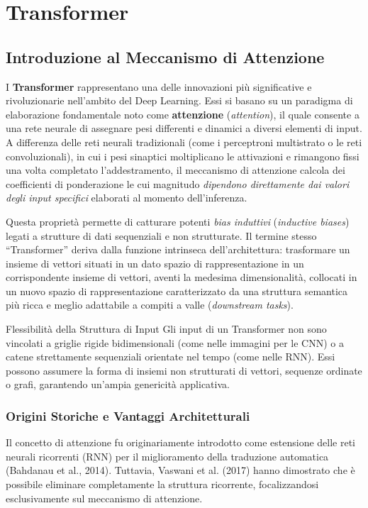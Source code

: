 
\chapter{Transformer}

\section{Introduzione al Meccanismo di Attenzione}
I \textbf{Transformer} rappresentano una delle innovazioni più significative e rivoluzionarie nell'ambito del Deep Learning. Essi si basano su un paradigma di elaborazione fondamentale noto come \textbf{attenzione} (\textit{attention}), il quale consente a una rete neurale di assegnare pesi differenti e dinamici a diversi elementi di input. A differenza delle reti neurali tradizionali (come i perceptroni multistrato o le reti convoluzionali), in cui i pesi sinaptici moltiplicano le attivazioni e rimangono fissi una volta completato l'addestramento, il meccanismo di attenzione calcola dei coefficienti di ponderazione le cui magnitudo \emph{dipendono direttamente dai valori degli input specifici} elaborati al momento dell'inferenza.

Questa proprietà permette di catturare potenti \emph{bias induttivi} (\textit{inductive biases}) legati a strutture di dati sequenziali e non strutturate. Il termine stesso ``Transformer'' deriva dalla funzione intrinseca dell'architettura: trasformare un insieme di vettori situati in un dato spazio di rappresentazione in un corrispondente insieme di vettori, aventi la medesima dimensionalità, collocati in un nuovo spazio di rappresentazione caratterizzato da una struttura semantica più ricca e meglio adattabile a compiti a valle (\textit{downstream tasks}).

\begin{observation}{Flessibilità della Struttura di Input}
Gli input di un Transformer non sono vincolati a griglie rigide bidimensionali (come nelle immagini per le CNN) o a catene strettamente sequenziali orientate nel tempo (come nelle RNN). Essi possono assumere la forma di insiemi non strutturati di vettori, sequenze ordinate o grafi, garantendo un'ampia genericità applicativa.
\end{observation}

\subsection{Origini Storiche e Vantaggi Architetturali}
Il concetto di attenzione fu originariamente introdotto come estensione delle reti neurali ricorrenti (RNN) per il miglioramento della traduzione automatica (Bahdanau et al., 2014). Tuttavia, Vaswani et al. (2017) hanno dimostrato che è possibile eliminare completamente la struttura ricorrente, focalizzandosi esclusivamente sul meccanismo di attenzione.

